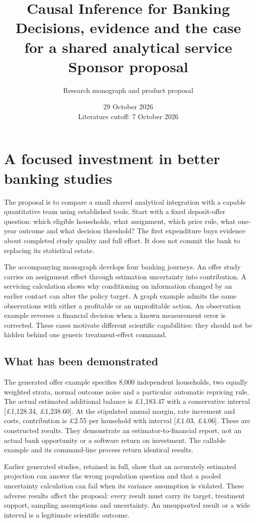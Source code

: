 \documentclass[11pt,a4paper,openany]{book}
\title{\sffamily\bfseries\color{ink}Causal Inference for Banking\\[14pt]
\Large Decisions, evidence and the case for a shared analytical service\\[8pt]\large Sponsor proposal}
\author{Research monograph and product proposal}
\date{29 October 2026\\Literature cutoff: 7 October 2026}
\begin{document}
\maketitle
\chapter*{A focused investment in better banking studies}

The proposal is to compare a small shared analytical integration with a
capable quantitative team using established tools. Start with a fixed
deposit-offer question: which eligible households, what assignment, which
price rule, what one-year outcome and what decision threshold? The first
expenditure buys evidence about completed study quality and full effort.
It does not commit the bank to replacing its statistical estate.

The accompanying monograph develops four banking journeys. An offer study
carries an assignment effect through estimation uncertainty into contribution.
A servicing calculation shows why conditioning on information changed by an
earlier contact can alter the policy target. A graph example admits the same
observations with either a profitable or an unprofitable action. An observation
example reverses a financial decision when a known measurement error is
corrected. These cases motivate different scientific capabilities; they
should not be hidden behind one generic treatment-effect command.

\section*{What has been demonstrated}
The generated offer example specifies 8,000 independent households, two
equally weighted strata, normal outcome noise and a particular automatic
repricing rule. The actual estimated additional balance is \pounds1,183.47
with a conservative interval [\pounds1,128.34, \pounds1,238.60]. At the
stipulated annual margin, rate increment and costs, contribution is
\pounds2.55 per household with interval [\pounds1.03, \pounds4.06].
These are constructed results. They demonstrate an estimator-to-financial
report, not an actual bank opportunity or a software return on investment.
The callable example and its command-line process return identical results.

Earlier generated studies, retained in full, show that an accurately
estimated projection can answer the wrong population question and that a
pooled uncertainty calculation can fail when its variance assumption is
violated. These adverse results affect the proposal: every result must
carry its target, treatment support, sampling assumptions and uncertainty.
An unsupported result or a wide interval is a legitimate scientific outcome.
\end{document}
